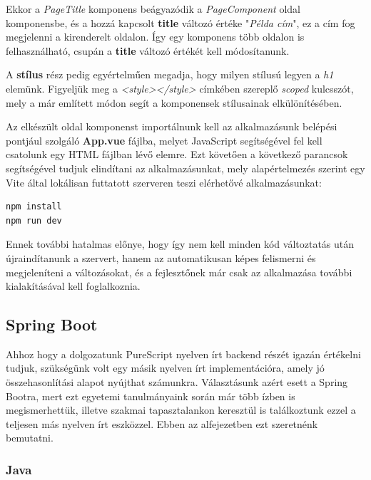 \documentclass[12pt]{article}
\begin{document}
Ekkor a \textit{PageTitle} komponens beágyazódik a \textit{PageComponent} oldal komponensbe, és a hozzá kapcsolt \textbf{title} változó értéke "\textit{Példa cím}", ez a cím fog megjelenni a kirenderelt oldalon. Így egy komponens több oldalon is felhasználható, csupán a \textbf{title} változó értékét kell módosítanunk.

A \textbf{stílus} rész pedig egyértelműen megadja, hogy milyen stílusú legyen a \textit{h1} elemünk. Figyeljük meg a \textit{<style></style>} címkében szereplő \textit{scoped} kulcsszót, mely a már említett módon segít a komponensek stílusainak elkülönítésében.

Az elkészült oldal komponenst importálnunk kell az alkalmazásunk belépési pontjául szolgáló \textbf{App.vue} fájlba, melyet JavaScript segítségével fel kell csatolunk egy HTML fájlban lévő elemre. Ezt követően a következő parancsok segítségével tudjuk elindítani az alkalmazásunkat, mely alapértelmezés szerint egy Vite \cite{https://vitejs.dev/} által lokálisan futtatott szerveren teszi elérhetővé alkalmazásunkat:
\begin{verbatim}
npm install
npm run dev
\end{verbatim}

Ennek további hatalmas előnye, hogy így nem kell minden kód változtatás után újraindítanunk a szervert, hanem az automatikusan képes felismerni és megjeleníteni a változásokat, és a fejlesztőnek már csak az alkalmazása további kialakításával kell foglalkoznia.

\subsection{Spring Boot}

Ahhoz hogy a dolgozatunk PureScript nyelven írt backend részét igazán értékelni tudjuk, szükségünk volt egy másik nyelven írt implementációra, amely jó összehasonlítási alapot nyújthat számunkra. Választásunk azért esett a Spring Bootra, mert ezt egyetemi tanulmányaink során már több ízben is megismerhettük, illetve szakmai tapasztalankon keresztül is találkoztunk ezzel a teljesen más nyelven írt eszközzel. Ebben az alfejezetben ezt szeretnénk bemutatni.

\subsubsection{Java}
\end{document}

